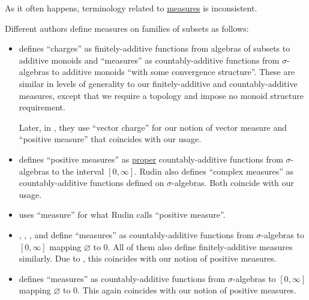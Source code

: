 \begin{remark}\label{rem:measure_terminology}
  As it often happens, terminology related to \hyperref[def:measure]{measures} is inconsistent.

  Different authors define measures on families of subsets as follows:
  \begin{itemize}
    \item {} defines \enquote{charges} as finitely-additive functions from algebras of subsets to additive monoids and \enquote{measures} as countably-additive functions from \( \sigma \)-algebras to additive monoids \enquote{with some convergence structure}. These are similar in levels of generality to our finitely-additive and countably-additive measures, except that we require a topology and impose no monoid structure requirement.

    Later, in \cite[\S 11.41]{Schechter1997AnalysisHandbook}, they use \enquote{vector charge} for our notion of vector measure and \enquote{positive measure} that coincides with our usage.

    \item {} defines \enquote{positive measures} as \hyperref[def:effective_domain]{proper} countably-additive functions from \( \sigma \)-algebras to the interval \( [0, \infty] \). Rudin also defines \enquote{complex measures} as countably-additive functions defined on \( \sigma \)-algebras. Both coincide with our usage.

    \item {} uses \enquote{measure} for what Rudin calls \enquote{positive measure}.

    \item {}, , ,  and  define \enquote{measures} as countably-additive functions from \( \sigma \)-algebras to \( [0, \infty] \) mapping \( \varnothing \) to \( 0 \). All of them also define finitely-additive measures similarly. Due to , this coincides with our notion of positive measures.

    \item {} defines \enquote{measures} as countably-additive functions from \( \sigma \)-algebras to \( [0, \infty] \) mapping \( \varnothing \) to \( 0 \). This again coincides with our notion of positive measures.


\end{itemize}
\end{remark}
